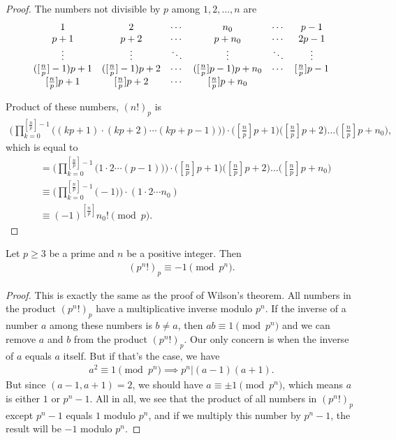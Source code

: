 \documentclass{subfile}
\begin{document}
	\begin{proof}
		The numbers not divisible by $p$ among $1, 2, \ldots, n$ are
			\[\begin{array}{*{20}{c}}
				1&2& \cdots &{{n_0}}& \cdots &{p - 1}\\
				{p + 1}&{p + 2}& \cdots &{p + {n_0}}& \cdots &{2p - 1}\\
				\vdots & \vdots & \ddots & \vdots & \ddots & \vdots \\
				{( {[{\textstyle{n \over p}}] - 1} )p + 1}&{( {[{\textstyle{n \over p}}] - 1} )p + 2}& \cdots &{( {[{\textstyle{n \over p}}]p - 1} )p + {n_0}}& \cdots &{[{\textstyle{n \over p}}]p - 1}\\
				{[{\textstyle{n \over p}}]p + 1}&{[{\textstyle{n \over p}}]p + 2}& \cdots &{[{\textstyle{n \over p}}]p + {n_0}}&{}&{}
			\end{array}\]

	Product of these numbers, $(n!)_p$ is
		\begin{align*}
			\Bigg(\prod_{k=0}^{[\frac np]-1}\!\!\bigl((kp+1)\cdot(kp+2)\cdots(kp+p-1)\bigr)\Bigg)  \cdot  
			\bigl([\tfrac np]p+1\bigl)\bigl([\tfrac np]p+2\bigl)\dots\bigl([\tfrac np]p+n_0\bigl),
		\end{align*}
	which is equal to
		\begin{align*}
			&=\Bigg(\prod_{k=0}^{[\frac np]-1}\!\!\bigl(1\cdot2\cdots(p-1)\bigr)\Bigg)  \cdot  
			\bigl([\tfrac np]p+1\bigl)\bigl([\tfrac np]p+2\bigl)\dots\bigl([\tfrac np]p+n_0\bigl)\\
			&\equiv \Bigg(\prod_{k=0}^{[\frac np]-1}\!\!\bigl(-1\bigr) \Bigg) \cdot \left(
			1 \cdot 2 \cdots n_0\right)\\
			&\equiv
			(-1)^{[\frac np]} n_0!\pmod p.
		\end{align*}
	\end{proof}

			
	\begin{proposition}
		Let $p\geq 3$ be a prime and $n$ be a positive integer. Then
			\begin{align*}
				(p^n!)_p \equiv -1 \pmod{p^n}.
			\end{align*}
	\end{proposition}
	
	\begin{proof}
		This is exactly the same as the proof of Wilson's theorem. All numbers in the product $(p^n!)_p$ have a multiplicative inverse modulo $p^n$. If the inverse of a number $a$ among these numbers is $b \neq a$, then $a b \equiv 1 \pmod{p^n}$ and we can remove $a$ and $b$ from the product $(p^n!)_p$. Our only concern is when the inverse of $a$ equals $a$ itself. But if that's the case, we have
			\begin{align*}
				a^2 \equiv 1 \pmod{p^n} \implies p^n| (a-1)(a+1).
			\end{align*}
		But since $(a-1,a+1)=2$, we should have $a \equiv \pm 1 \pmod{p^n}$, which means $a$ is either $1$ or $p^n-1$. All in all, we see that the product of all numbers in $(p^n!)_p$ except $p^n-1$ equals $1$ modulo $p^n$, and if we multiply this number by $p^n-1$, the result will be $-1$ modulo $p^n$.
	\end{proof}
	
\end{document}
